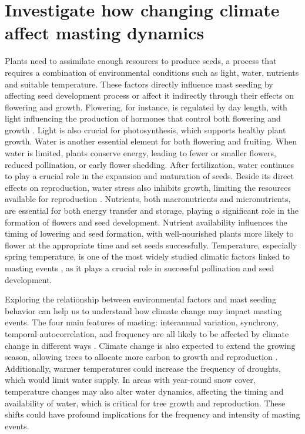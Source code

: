 \documentclass[11pt,letter]{article}
\begin{document}
\section{Investigate how changing climate affect masting dynamics}
Plants need to assimilate enough resources to produce seeds, a process that requires a combination of environmental conditions such as light, water, nutrients and suitable temperature. These factors directly influence mast seeding by affecting seed development process or affect it indirectly through their effects on flowering and growth. Flowering, for instance, is regulated by day length, with light influencing the production of hormones that control both flowering and growth \citep{lau2010plant}. Light is also crucial for photosynthesis, which supports healthy plant growth. Water is another essential element for both flowering and fruiting. When water is limited, plants conserve energy, leading to fewer or smaller flowers, reduced pollination, or early flower shedding. After fertilization, water continues to play a crucial role in the expansion and maturation of seeds. Beside its direct effects on reproduction, water stress also inhibits growth, limiting the resources available for reproduction \citep{hsiao1973plant, anjum2011morphological}. Nutrients, both macronutrients and micronutrients, are essential for both energy transfer and storage, playing a significant role in the formation of flowers and seed development. Nutrient availability influences the timing of lowering and seed formation, with well-nourished plants more likely to flower at the appropriate time and set seeds successfully. Temperature, especially spring temperature, is one of the most widely studied climatic factors linked to masting events \citep{bajocco2021characterizing, moreira2015effects, schauber2002masting, bogdziewicz2024evolutionary}, as it plays a crucial role in successful pollination and seed development.\par

Exploring the relationship between environmental factors and mast seeding behavior can help us to understand how climate change may impact masting events. The four main features of masting: interannual variation, synchrony, temporal autocorrelation, and frequency are all likely to be affected by climate change in different ways \citep{hacket2021climate}. Climate change is also expected to extend the growing season, allowing trees to allocate more carbon to growth and reproduction \citep{keenan2014net}. Additionally, warmer temperatures could increase the frequency of droughts, which would limit water supply. In areas with year-round snow cover, temperature changes may also alter water dynamics, affecting the timing and availability of water, which is critical for tree growth and reproduction. These shifts could have profound implications for the frequency and intensity of masting events.\par
\end{document}
